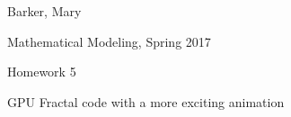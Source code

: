 \documentclass{article}
\def \hwnum{5}
\def \hwdescription{GPU Fractal code with a more exciting animation}
\def \hwscript{hw05.cu}
\begin{document}
{\color{white}{thing}}
\begin{center}
{
	\fontsize{20pt}{20pt}\selectfont
	Barker, Mary
}

\vspace{1cm}

{
	\fontsize{20pt}{20pt}\selectfont
	Mathematical Modeling, Spring 2017
}

\vspace{1cm}

{
	\fontsize{20pt}{20pt}\selectfont
	Homework \hwnum
}

\vspace{1cm}

{
	\fontsize{20pt}{20pt}\selectfont
	\hwdescription
}

\end{center}
\pagebreak

\end{document}
